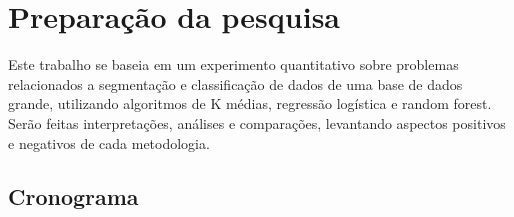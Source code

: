 
\part{Preparação da pesquisa}

Este trabalho se baseia em um experimento quantitativo sobre problemas relacionados a segmentação e classificação de dados de uma base de dados grande, utilizando algoritmos de K médias, regressão logística e random forest. Serão feitas interpretações, análises e comparações, levantando aspectos positivos e negativos de cada metodologia.

\chapter{Cronograma}

